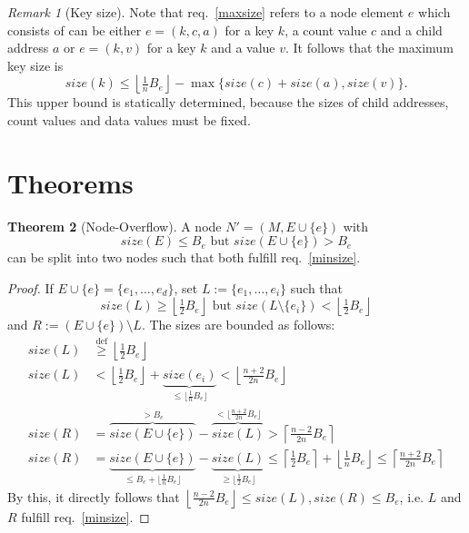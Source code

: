 \documentclass[a4paper, 8pt, twoclumn]{scrartcl}
\theoremstyle{plain}
\theoremstyle{definition}
\newtheorem{thm}{Theorem}[section]
\theoremstyle{remark}
\newtheorem{rem}[thm]{Remark}
\newcommand{\Beff}{B_e}
\newcommand{\Lfloor}{\left\lfloor}
\newcommand{\Rfloor}{\right\rfloor}
\newcommand{\Lceil}{\left\lceil}
\newcommand{\Rceil}{\right\rceil}
\begin{document}
\begin{multicols}{2}
\begin{rem}[Key size]
Note that req.~\ref{maxsize} refers to a node element $e$ which consists
of can be either \mbox{$e = (k, c, a)$} for a key $k$, a count value $c$ and
a child address $a$ or \mbox{$e = (k, v)$} for a key $k$ and a value $v$.
It follows that the maximum key size is
\[ size(k) \leq \Lfloor \tfrac{1}{n} \Beff \Rfloor
		- \max \{ size(c) + size(a), size(v) \}. \]
This upper bound is statically determined, because the sizes of child addresses,
count values and data values must be fixed.
\end{rem}



\section{Theorems} %

\begin{thm}[Node-Overflow]
A node \mbox{$N' = (M, E \cup \{ e \})$} with 
\[ size(E) \leq \Beff \text{ but } size(E \cup \{e\}) > \Beff \]
can be split into two nodes such that both fulfill req.~\ref{minsize}.

\begin{proof}
If \mbox{$E \cup \{e\} = \{ e_1, \ldots, e_d \}$}, set
\mbox{$L := \{ e_1, \ldots, e_i \}$} such that
\[ size(L) \geq \Lfloor \tfrac{1}{2} \Beff \Rfloor \text{ but }
size(L \setminus \{e_i\}) < \Lfloor \tfrac{1}{2} \Beff \Rfloor \]
and \mbox{$R := (E \cup \{e\}) \setminus L$}.
The sizes are bounded as follows:
\begin{align*}
size(L) &\stackrel{\mathrm{def}}{\geq} \Lfloor \tfrac{1}{2} \Beff \Rfloor\\
size(L) &< \Lfloor \tfrac{1}{2} \Beff \Rfloor
		+ \underbrace{size(e_i)}_{\leq \lfloor \frac{1}{n} \Beff \rfloor}
	< \Lfloor \tfrac{n+2}{2n} \Beff \Rfloor\\
size(R) &= \overbrace{size(E \cup \{e\})}^{> \Beff}
		- \overbrace{size(L)}^{< \lfloor \frac{n+2}{2n} \Beff \rfloor}
	> \Lceil \tfrac{n-2}{2n} \Beff \Rceil\\
size(R) &= \underbrace{size(E \cup \{e\})}_{
			\leq \Beff + \lfloor \frac{1}{n} \Beff \rfloor}
		- \underbrace{size(L)}_{\geq \lfloor \frac{1}{2} \Beff \rfloor}
	\leq \Lceil \tfrac{1}{2} \Beff \Rceil + \Lfloor \tfrac{1}{n} \Beff \Rfloor
	\leq \Lceil \tfrac{n+2}{2n} \Beff \Rceil
\end{align*}
By this, it directly follows that 
\mbox{$\Lfloor \tfrac{n-2}{2n} \Beff \Rfloor \leq size(L), size(R) \leq \Beff$},
i.e.  $L$ and $R$ fulfill req.~\ref{minsize}.
\end{proof}
\end{thm}



\end{multicols}
\end{document}
